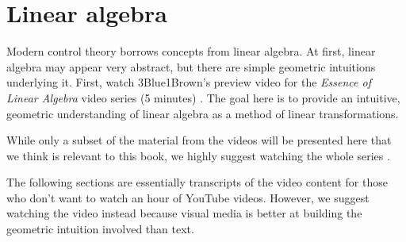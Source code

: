 
\chapter{Linear algebra}

Modern control theory borrows concepts from linear algebra. At first, linear
algebra may appear very abstract, but there are simple geometric intuitions
underlying it. First, watch 3Blue1Brown's preview video for the
\textit{Essence of Linear Algebra} video series (5 minutes)
\cite{bib:linalg_preview}. The goal here is to provide an intuitive, geometric
understanding of linear algebra as a method of linear transformations.

While only a subset of the material from the videos will be presented here that
we think is relevant to this book, we highly suggest watching the whole series
\cite{bib:essence_of_linalg}.

\begin{remark}
  The following sections are essentially transcripts of the video content for
  those who don't want to watch an hour of YouTube videos. However, we suggest
  watching the video instead because visual media is better at building the
  geometric intuition involved than text.
\end{remark}










